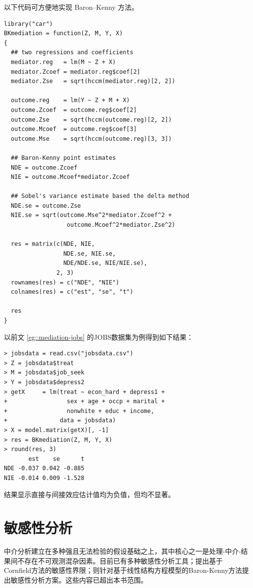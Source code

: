 以下代码可方便地实现 Baron--Kenny 方法。 

 \begin{lstlisting}
library("car")
BKmediation = function(Z, M, Y, X)
{
  ## two regressions and coefficients
  mediator.reg   = lm(M ~ Z + X)
  mediator.Zcoef = mediator.reg$coef[2]
  mediator.Zse   = sqrt(hccm(mediator.reg)[2, 2])
  
  outcome.reg    = lm(Y ~ Z + M + X)
  outcome.Zcoef  = outcome.reg$coef[2]
  outcome.Zse    = sqrt(hccm(outcome.reg)[2, 2])
  outcome.Mcoef  = outcome.reg$coef[3]
  outcome.Mse    = sqrt(hccm(outcome.reg)[3, 3])
  
  ## Baron-Kenny point estimates
  NDE = outcome.Zcoef
  NIE = outcome.Mcoef*mediator.Zcoef
  
  ## Sobel's variance estimate based the delta method
  NDE.se = outcome.Zse
  NIE.se = sqrt(outcome.Mse^2*mediator.Zcoef^2 + 
                  outcome.Mcoef^2*mediator.Zse^2)
  
  res = matrix(c(NDE, NIE, 
                 NDE.se, NIE.se,
                 NDE/NDE.se, NIE/NIE.se), 
               2, 3)
  rownames(res) = c("NDE", "NIE")
  colnames(res) = c("est", "se", "t")
  
  res
}
 \end{lstlisting}
 
 
 以前文 \ref{eg::mediation-jobs} 的JOBS数据集为例得到如下结果：
 
 \begin{lstlisting}
> jobsdata = read.csv("jobsdata.csv")
> Z = jobsdata$treat
> M = jobsdata$job_seek
> Y = jobsdata$depress2
> getX     = lm(treat ~ econ_hard + depress1 + 
+                 sex + age + occp + marital + 
+                 nonwhite + educ + income,
+               data = jobsdata)
> X = model.matrix(getX)[, -1]
> res = BKmediation(Z, M, Y, X)
> round(res, 3)
       est    se      t
NDE -0.037 0.042 -0.885
NIE -0.014 0.009 -1.528
\end{lstlisting}

结果显示直接与间接效应估计值均为负值，但均不显著。 



\section{敏感性分析}


中介分析建立在多种强且无法检验的假设基础之上，其中核心之一是处理-中介-结果间不存在不可观测混杂因素。目前已有多种敏感性分析工具；\citet{ding2016sharp}提出基于Cornfield方法的敏感性界限；\citet{zhang2022interpretable}则针对基于线性结构方程模型的Baron-Kenny方法提出敏感性分析方案。这些内容已超出本书范围。





